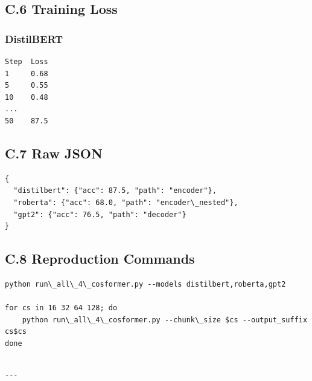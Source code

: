 \subsection{C.6 Training Loss}

\subsubsection{DistilBERT}

\begin{lstlisting}
Step  Loss
1     0.68
5     0.55
10    0.48
...
50    87.5
\end{lstlisting}

\subsection{C.7 Raw JSON}

\begin{lstlisting}
{
  "distilbert": {"acc": 87.5, "path": "encoder"},
  "roberta": {"acc": 68.0, "path": "encoder\_nested"},
  "gpt2": {"acc": 76.5, "path": "decoder"}
}
\end{lstlisting}

\subsection{C.8 Reproduction Commands}

\begin{lstlisting}
python run\_all\_4\_cosformer.py --models distilbert,roberta,gpt2

for cs in 16 32 64 128; do
    python run\_all\_4\_cosformer.py --chunk\_size $cs --output_suffix cs$cs
done
\end{lstlisting}
\begin{lstlisting}

---
\end{lstlisting}